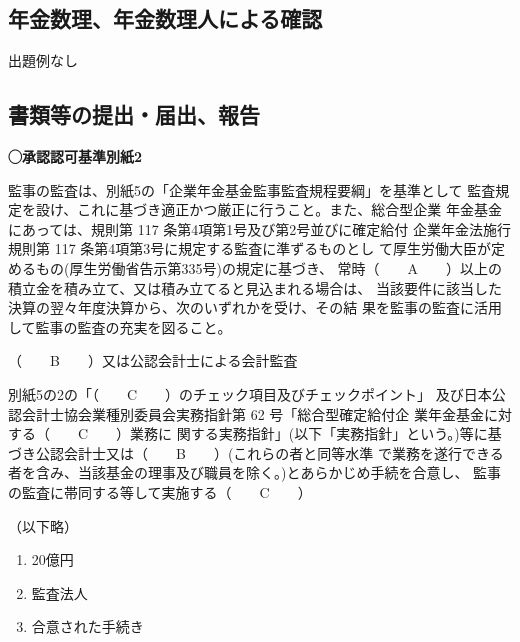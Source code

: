 \newpage

\subsection{年金数理、年金数理人による確認}

出題例なし

\newpage

\subsection{書類等の提出・届出、報告}

\begin{fillblank}[数理人試験 2021 問題4 設問1]
  \noindent \textbf{◯承認認可基準別紙2}
  \begin{lawstructure}
    \begin{lawarticle}{}{}
      監事の監査は、別紙5の「企業年金基金監事監査規程要綱」を基準として 監査規定を設け、これに基づき適正かつ厳正に行うこと。また、総合型企業 年金基金にあっては、規則第 117 条第4項第1号及び第2号並びに確定給付 企業年金法施行規則第 117 条第4項第3号に規定する監査に準ずるものとし て厚生労働大臣が定めるもの(厚生労働省告示第335号)の規定に基づき、 常時（　　A　　）以上の積立金を積み立て、又は積み立てると見込まれる場合は、 当該要件に該当した決算の翌々年度決算から、次のいずれかを受け、その結 果を監事の監査に活用して監事の監査の充実を図ること。

      （　　B　　）又は公認会計士による会計監査

      別紙5の2の「（　　C　　）のチェック項目及びチェックポイント」
      及び日本公認会計士協会業種別委員会実務指針第 62 号「総合型確定給付企 業年金基金に対する（　　C　　）業務に
      関する実務指針」(以下「実務指針」という。)等に基づき公認会計士又は（　　B　　）(これらの者と同等水準
      で業務を遂行できる者を含み、当該基金の理事及び職員を除く。)とあらかじめ手続を合意し、
      監事の監査に帯同する等して実施する（　　C　　）

      （以下略）
    \end{lawarticle}
  \end{lawstructure}
\end{fillblank}

\begin{answerbox}
  \begin{enumerate}[A: ]
    \item 20億円
    \item 監査法人
    \item 合意された手続き
  \end{enumerate}
\end{answerbox}

